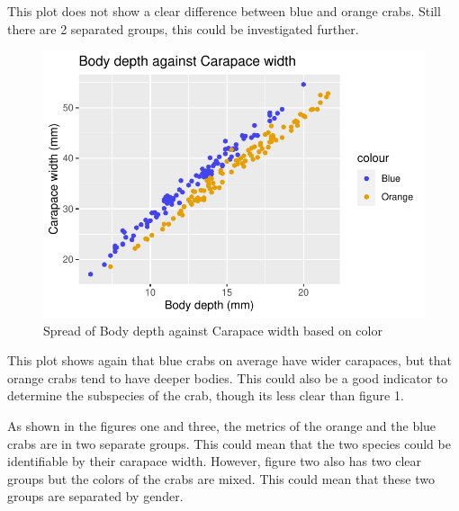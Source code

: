\documentclass[
]{article}
\begin{document}
This plot does not show a clear difference between blue and orange
crabs. Still there are 2 separated groups, this could be investigated
further.

\begin{figure}[H]

{\centering \includegraphics{CrabProject_files/figure-latex/figure3-1} 

}

\caption{Spread of Body depth against Carapace width based on color}\label{fig:figure3}
\end{figure}

This plot shows again that blue crabs on average have wider carapaces,
but that orange crabs tend to have deeper bodies. This could also be a
good indicator to determine the subspecies of the crab, though its less
clear than figure 1.

As shown in the figures one and three, the metrics of the orange and the
blue crabs are in two separate groups. This could mean that the two
species could be identifiable by their carapace width. However, figure
two also has two clear groups but the colors of the crabs are mixed.
This could mean that these two groups are separated by gender.
\end{document}
